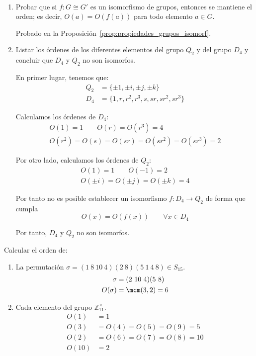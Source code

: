 \begin{ejercicio}\label{ej:2.30}~
    \begin{enumerate}
        \item Probar que si $f : G \cong G'$ es un isomorfismo de grupos, entonces se mantiene el orden; es decir, $O(a) = O(f(a))$ para todo elemento $a \in G$.
        
        Probado en la Proposición~\ref{prop:propiedades_grupos_isomorf}.
        \item Listar los órdenes de los diferentes elementos del grupo $Q_2$ y del grupo $D_4$ y concluir que $D_4$ y $Q_2$ no son isomorfos.
        
        En primer lugar, tenemos que:
        \begin{align*}
            Q_2 &= \{\pm 1, \pm i, \pm j, \pm k\}\\
            D_4 &= \{1, r, r^2, r^3, s, sr, sr^2, sr^3\}
        \end{align*}

        Calculamos los órdenes de $D_4$:
        \begin{gather*}
            O(1) =1\qquad O(r)=O(r^3)=4\\
            O(r^2)=O(s)=O(sr)=O(sr^2)=O(sr^3)=2
        \end{gather*}

        Por otro lado, calculamos los órdenes de $Q_2$:
        \begin{gather*}
            O(1)=1\qquad O(-1)=2\\
            O(\pm i)=O(\pm j)=O(\pm k)=4
        \end{gather*}

        Por tanto no es posible establecer un isomorfismo $f:D_4\to Q_2$ de forma que cumpla
        \begin{equation*}
            O(x)=O(f(x))\qquad \forall x\in D_4
        \end{equation*}

        Por tanto, $D_4$ y $Q_2$ no son isomorfos.
    \end{enumerate}
\end{ejercicio}

\begin{ejercicio}\label{ej:2.31}
    Calcular el orden de:
    \begin{enumerate}
        \item La permutación $\sigma = (1\ 8\ 10\ 4)(2\ 8)(5\ 1\ 4\ 8)\in S_{15}$.
        \begin{align*}
            \sigma &= (2\ 10\ 4)(5\ 8)\\
            O(\sigma) &= \mcm(3,2)=6
        \end{align*}
        \item Cada elemento del grupo $\mathbb{Z}^{\times}_{11}$.
        \begin{align*}
            O(1)&=1\\
            O(3)&=O(4)=O(5)=O(9)=5\\
            O(2)&=O(6)=O(7)=O(8)=10\\
            O(10)&=2
        \end{align*}
    \end{enumerate}
\end{ejercicio}

